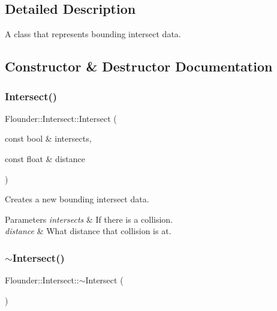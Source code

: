 \subsection{Detailed Description}
A class that represents bounding intersect data. 



\subsection{Constructor \& Destructor Documentation}
\mbox{\label{class_flounder_1_1_intersect_aaca438965a269141dee10ac4d93c9038}} 
\subsubsection{\texorpdfstring{Intersect()}{Intersect()}}
{\footnotesize\ttfamily Flounder\+::\+Intersect\+::\+Intersect (\begin{DoxyParamCaption}\item[{const bool \&}]{intersects,  }\item[{const float \&}]{distance }\end{DoxyParamCaption})\hspace{0.3cm}{\ttfamily [inline]}}



Creates a new bounding intersect data. 


\begin{DoxyParams}{Parameters}
{\em intersects} & If there is a collision. \\
\hline
{\em distance} & What distance that collision is at. \\
\hline
\end{DoxyParams}
\mbox{\label{class_flounder_1_1_intersect_a226bc38157f0797edc21814d96165d2f}} 
\subsubsection{\texorpdfstring{$\sim$\+Intersect()}{~Intersect()}}
{\footnotesize\ttfamily Flounder\+::\+Intersect\+::$\sim$\+Intersect (\begin{DoxyParamCaption}{ }\end{DoxyParamCaption})\hspace{0.3cm}{\ttfamily [inline]}}



